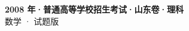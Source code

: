 \documentclass[zihao=-4, a4paper]{ctexart}
\begin{document}
\begin{center}
  {\Large\bfseries 2008 年·普通高等学校招生考试·山东卷·理科}\\[4pt]
  {\large 数学 · 试题版}
\end{center}
\medskip
{}

\end{document}

